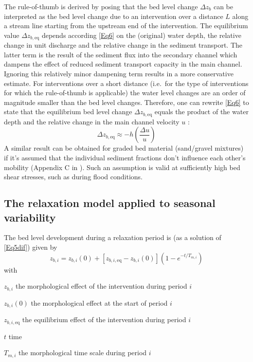 The rule-of-thumb is derived by posing that the bed level change $\Delta z_b$ can be interpreted as the bed level change due to an intervention over a distance $L$ along a stream line starting from the upstream end of the intervention.
The equilibrium value $\Delta z_{b,\text{eq}}$ depends according \autoref{Eq6} on the (original) water depth, the relative change in unit discharge and the relative change in the sediment transport.
The latter term is the result of the sediment flux into the secondary channel which dampens the effect of reduced sediment transport capacity in the main channel.
Ignoring this relatively minor dampening term results in a more conservative estimate.
For interventions over a short distance (i.e.~for the type of interventions for which the rule-of-thumb is applicable) the water level changes are an order of magnitude smaller than the bed level changes.
Therefore, one can rewrite \autoref{Eq6} to state that the equilibrium bed level change $\Delta z_{b,\text{eq}}$ equals the product of the water depth and the relative change in the main channel velocity $u$ :
%
\begin{equation}
\Delta z_{b,\text{eq}} \approx -h \left ( \frac{\Delta u}{u} \right )
\label{Eq6v2}
\end{equation}
%
A similar result can be obtained for graded bed material (sand/gravel mixtures) if it's assumed that the individual sediment fractions don't influence each other's mobility (Appendix C in \citet{Waterdienst2008}).
Such an assumption is valid at sufficiently high bed shear stresses, such as during flood conditions.

\subsection{The relaxation model applied to seasonal variability}

The bed level development during a relaxation period is (as a solution of \autoref{Eq5dif}) given by
%
\begin{equation}
z_{b,i} = z_{b,i} (0) + [z_{b,i,\text{eq}} - z_{b,i}(0)](1 - e^{-t/T_{m,i}})
\label{Eq7}
\end{equation}
%
with
%
\begin{symbollist}
\item[$z_{b,i}$]  the morphological effect of the intervention during period $i$
\item[$z_{b,i}(0)$]  the morphological effect at the start of period $i$
\item[$z_{b,i,\text{eq}}$]  the equilibrium effect of the intervention during period $i$
\item[$t$]  time
\item[$T_{m,i}$]  the morphological time scale during period $i$
\end{symbollist}

